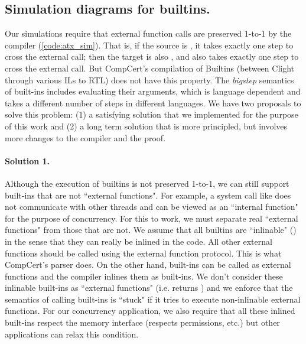 \subsection{Simulation diagrams for builtins.}\label{sec:builtins}
Our simulations require that external function calls are preserved 1-to-1 by the compiler (\cref{code:atx_sim}).  That is, if the source is , it takes exactly one step to cross the external call; then the target is also , and also takes exactly one step to cross the external call.  But CompCert's compilation of Builtins (between Clight through various ILs to RTL) does not have this property. The \emph{bigstep} semantics of  built-ins includes evaluating their arguments, which is language dependent and takes a different number of steps in different languages. We have two proposals to solve this problem: (1)  a satisfying solution that we implemented for the purpose of this work and (2) a long term solution that is more principled, but involves more changes to the compiler and the proof.


\paragraph{Solution 1.} Although the execution of builtins is not preserved 1-to-1, we can still support built-ins that are not ``external functions". For example, a system call like  does not communicate with other threads and can be viewed as an ``internal function" for the purpose of concurrency. For this to work, we must separate real ``external functions" from those that are not. We assume that all builtins are ``inlinable" () in the sense that they can really be inlined in the code. All other external functions should be called using the external function protocol. This is what CompCert's parser does. On the other hand, built-ins can be called as external functions and the compiler inlines them as built-ins. We don't consider these inlinable built-ins as ``external functions" (i.e.  returns ) and we enforce that the semantics of calling built-ins is ``stuck" if it tries to execute non-inlinable external functions. For our concurrency application, we also require that all these inlined built-ins respect the memory interface (respects permissions, etc.) but other applications can relax this condition.

